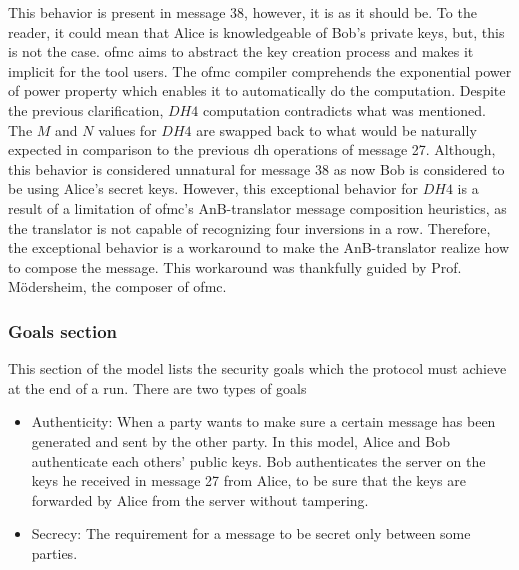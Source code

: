 This behavior is present in message 38, however, it is as it should be. To the reader, it could mean that Alice is knowledgeable of Bob's private keys, but, this is not the case. \gls{ofmc} aims to abstract the key creation process and makes it implicit for the tool users. The \gls{ofmc} compiler comprehends the exponential power of power property which enables it to automatically do the computation. Despite the previous clarification, $DH4$ computation contradicts what was mentioned. The $M$ and $N$ values for $DH4$ are swapped back to what would be naturally expected in comparison to the previous \gls{dh} operations of message 27. Although, this behavior is considered unnatural for message 38 as now Bob is considered to be using Alice's secret keys. However, this exceptional behavior for $DH4$ is a result of a limitation of \gls{ofmc}'s AnB-translator message composition heuristics, as the translator is not capable of recognizing four inversions in a row. Therefore, the exceptional behavior is a workaround to make the AnB-translator realize how to compose the message. This workaround was thankfully guided by Prof. M\"{o}dersheim, the composer of \gls{ofmc}.
  
\subsubsection{Goals section}
This section of the model lists the security goals which the protocol must achieve at the end of a run. There are two types of goals
\begin{itemize}
	\item Authenticity: When a party wants to make sure a certain message has been generated and sent by the other party. In this model, Alice and Bob authenticate each others' public keys. Bob authenticates the server on the keys he received in message 27 from Alice, to be sure that the keys are forwarded by Alice from the server without tampering.
	\item Secrecy: The requirement for a message to be secret only between some parties.
\end{itemize}

%



